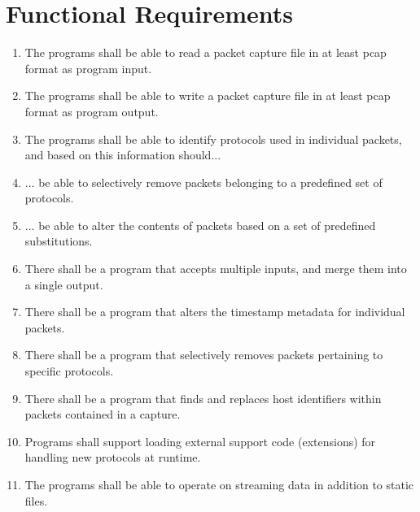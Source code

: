 \documentclass[10pt,a4paper,notitlepage,twoside]{report}
\begin{document}
\section{Functional Requirements}

\begin{enumerate}[label=\bfseries FR\arabic*:]
\item \label{fr:1} The programs shall be able to read a packet capture file in at least pcap format as program input.
\item \label{fr:2} The programs shall be able to write a packet capture file in at least pcap format as program output.
\item \label{fr:3} The programs shall be able to identify protocols used in individual packets, and based on this information should...
\item \label{fr:4} ... be able to selectively remove packets belonging to a predefined set of protocols.
\item \label{fr:5} ... be able to alter the contents of packets based on a set of predefined substitutions.
\item \label{fr:6} There shall be a program that accepts multiple inputs, and merge them into a single output.
\item \label{fr:7} There shall be a program that alters the timestamp metadata for individual packets.
\item \label{fr:8} There shall be a program that selectively removes packets pertaining to specific protocols.
\item \label{fr:9} There shall be a program that finds and replaces host identifiers within packets contained in a capture.
\item \label{fr:10} Programs shall support loading external support code (extensions) for handling new protocols at runtime.
\item \label{fr:11} The programs shall be able to operate on streaming data in addition to static files.
\end{enumerate}

\pagebreak
\end{document}
